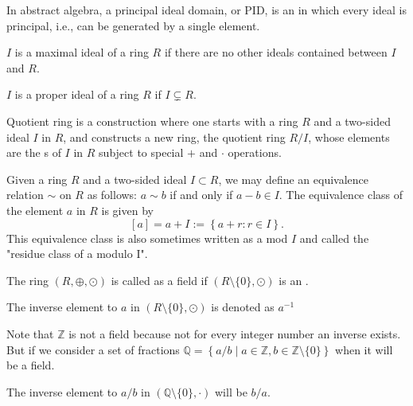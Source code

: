 \begin{definition}
  In abstract algebra, a principal ideal domain, or PID, is an
   in which every ideal is principal, i.e., can be
  generated by a single element.
  \label{def:pid}
\end{definition}

\begin{definition}
$I$ is a maximal ideal of a ring $R$ if there are no other ideals
contained between $I$ and $R$.
\label{def:maxideal}
\end{definition}

\begin{definition}
$I$ is a proper ideal of a ring $R$ if $I \subsetneq R$.
\label{def:properideal}
\end{definition}

\begin{definition}
  Quotient ring is a construction where one
  starts with a ring $R$ and a two-sided ideal $I$ in $R$, and constructs a
  new ring, the quotient ring $R/I$, whose elements are the
  s of $I$ 
  in $R$ subject to special $+$ and $\cdot$ operations.

  Given a ring $R$ and a two-sided ideal $I \subset R$, we may define
  an equivalence relation $\sim$ on $R$ as follows: 
  $a \sim b$ if and only if $a - b \in I$.
  The equivalence class of the element $a$ in $R$ is given by
  \[
  \left[a\right] = a + I := \left\{ a + r : r \in I \right\}.
  \]
  This equivalence class is also sometimes written as a mod $I$ and
  called the "residue class of a modulo I".
  \label{def:quotientring}
\end{definition}

\begin{definition}[Field]
  The ring $\left(R, \oplus, \odot\right)$ is called as a field if
  $\left(R \setminus \{0\}, \odot\right)$ is an .

  The inverse element to $a$ in
  $\left(R \setminus\{0\}, \odot\right)$ is denoted as $a^{-1}$
  \label{def:field}
\end{definition}

\begin{example}
  Note that $\mathbb{Z}$ is not a field because not for every integer
  number an inverse exists. But if we consider a set of fractions
  $\mathbb{Q} = \left\{a/b \mid a \in \mathbb{Z}, b \in
  \mathbb{Z}\setminus\{0\}\right\}$ when it will be a field.

  The
  inverse element to $a/b$  in
  $\left(\mathbb{Q}\setminus\{0\}, \cdot\right)$  will be $b/a$.
  \label{ex:field}
\end{example}

